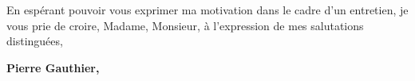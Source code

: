 \documentclass{cv_style}
\begin{document}
En espérant pouvoir vous exprimer ma motivation dans le cadre d’un entretien,
je vous prie de croire, Madame, Monsieur, à l’expression de mes salutations
distinguées, 

\vspace{0.4cm}
\begin{flushright}
\parbox{5cm}{
\centering
    \textbf{Pierre Gauthier,}\\
}
\end{flushright}
\end{document}
